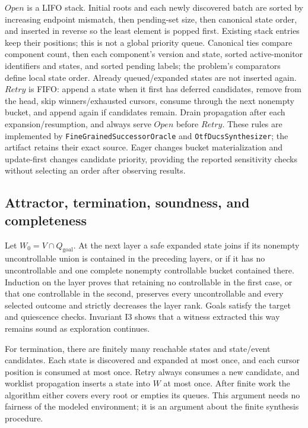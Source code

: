 \documentclass[11pt]{article}
\newcommand{\Goal}{Q_{\mathrm{goal}}}
\begin{document}
$Open$ is a LIFO stack. Initial roots and each newly discovered batch are sorted by increasing endpoint mismatch, then pending-set size, then canonical state order, and inserted in reverse so the least element is popped first. Existing stack entries keep their positions; this is not a global priority queue. Canonical ties compare component count, then each component's version and state, sorted active-monitor identifiers and states, and sorted pending labels; the problem's comparators define local state order. Already queued/expanded states are not inserted again. $Retry$ is FIFO: append a state when it first has deferred candidates, remove from the head, skip winners/exhausted cursors, consume through the next nonempty bucket, and append again if candidates remain. Drain propagation after each expansion/resumption, and always serve $Open$ before $Retry$. These rules are implemented by \texttt{FineGrainedSuccessorOracle} and \texttt{OtfDucsSynthesizer}; the artifact retains their exact source. Eager changes bucket materialization and update-first changes candidate priority, providing the reported sensitivity checks without selecting an order after observing results.

\subsection{Attractor, termination, soundness, and completeness}
Let $W_0=V\cap\Goal$. At the next layer a safe expanded state joins if its nonempty uncontrollable union is contained in the preceding layers, or if it has no uncontrollable and one complete nonempty controllable bucket contained there. Induction on the layer proves that retaining no controllable in the first case, or that one controllable in the second, preserves every uncontrollable and every selected outcome and strictly decreases the layer rank. Goals satisfy the target and quiescence checks. Invariant I3 shows that a witness extracted this way remains sound as exploration continues.

For termination, there are finitely many reachable states and state/event candidates. Each state is discovered and expanded at most once, and each cursor position is consumed at most once. Retry always consumes a new candidate, and worklist propagation inserts a state into $W$ at most once. After finite work the algorithm either covers every root or empties its queues. This argument needs no fairness of the modeled environment; it is an argument about the finite synthesis procedure.
\end{document}
